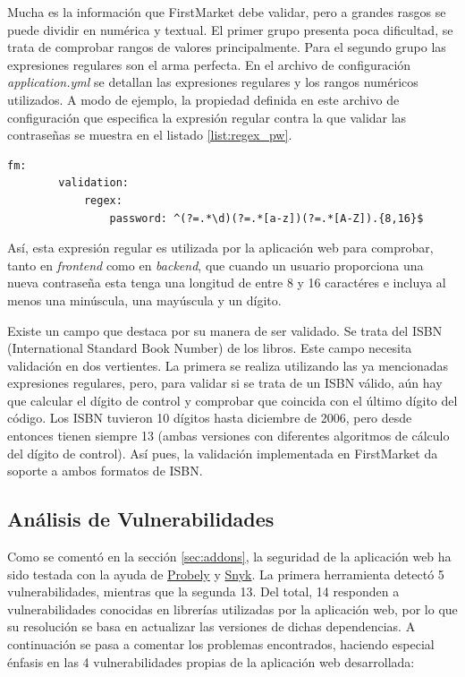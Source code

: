 \documentclass[a4paper]{article}
\begin{document}
	Mucha es la información que FirstMarket debe validar, pero a grandes rasgos se puede dividir en numérica y textual. El primer grupo presenta poca dificultad, se trata de comprobar rangos de valores principalmente. Para el segundo grupo las expresiones regulares son el arma perfecta. En el archivo de configuración \emph{application.yml} se detallan las expresiones regulares y los rangos numéricos utilizados. A modo de ejemplo, la propiedad definida en este archivo de configuración que especifica la expresión regular contra la que validar las contraseñas se muestra en el listado \ref{list:regex_pw}.
	\\
	
	\begin{lstlisting}[caption=Expresión regular para las contraseñas,label=list:regex_pw]
	fm:
		validation:
			regex:
				password: ^(?=.*\d)(?=.*[a-z])(?=.*[A-Z]).{8,16}$
	\end{lstlisting}
	
	Así, esta expresión regular es utilizada por la aplicación web para comprobar, tanto en \emph{frontend} como en \emph{backend}, que cuando un usuario proporciona una nueva contraseña esta tenga una longitud de entre 8 y 16 caractéres e incluya al menos una minúscula, una mayúscula y un dígito.
	
	Existe un campo que destaca por su manera de ser validado. Se trata del ISBN (International Standard Book Number) de los libros. Este campo necesita validación en dos vertientes. La primera se realiza utilizando las ya mencionadas expresiones regulares, pero, para validar si se trata de un ISBN válido, aún hay que calcular el dígito de control y comprobar que coincida con el último dígito del código. Los ISBN tuvieron 10 dígitos hasta diciembre de 2006, pero desde entonces tienen siempre 13 (ambas versiones con diferentes algoritmos de cálculo del dígito de control). Así pues, la validación implementada en FirstMarket da soporte a ambos formatos de ISBN.
	
	\subsection{Análisis de Vulnerabilidades} \label{sec:vulnerabilities}
	Como se comentó en la sección \ref{sec:addons}, la seguridad de la aplicación web ha sido testada con la ayuda de \href{https://probely.com/}{Probely} y \href{https://snyk.io/}{Snyk}. La primera herramienta detectó 5 vulnerabilidades, mientras que la segunda 13. Del total, 14 responden a vulnerabilidades conocidas en librerías utilizadas por la aplicación web, por lo que su resolución se basa en actualizar las versiones de dichas dependencias. A continuación se pasa a comentar los problemas encontrados, haciendo especial énfasis en las 4 vulnerabilidades propias de la aplicación web desarrollada: 
	
\end{document}
